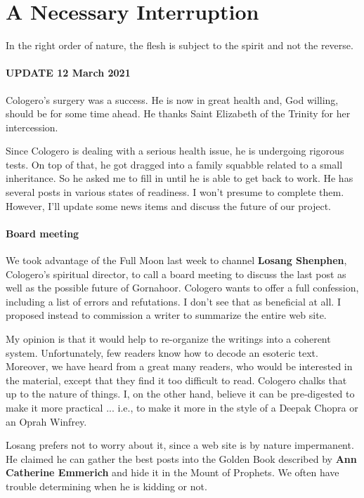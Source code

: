 \section{A Necessary Interruption}

\begin{quotex}
In the right order of nature, the flesh is subject to the spirit and not the reverse.
\end{quotex}


\paragraph{UPDATE 12 March 2021}
Cologero's surgery was a success. He is now in great health and, God willing, should be for some time ahead. He thanks Saint Elizabeth of the Trinity for her intercession.

Since Cologero is dealing with a serious health issue, he is undergoing rigorous tests. On top of that, he got dragged into a family squabble related to a small inheritance. So he asked me to fill in until he is able to get back to work. He has several posts in various states of readiness. I won't presume to complete them. However, I'll update some news items and discuss the future of our project.

\paragraph{Board meeting}


We took advantage of the Full Moon last week to channel \textbf{Losang Shenphen}, Cologero's spiritual director, to call a board meeting to discuss the last post as well as the possible future of Gornahoor. Cologero wants to offer a full confession, including a list of errors and refutations. I don't see that as beneficial at all. I proposed instead to commission a writer to summarize the entire web site.

My opinion is that it would help to re-organize the writings into a coherent system. Unfortunately, few readers know how to decode an esoteric text. Moreover, we have heard from a great many readers, who would be interested in the material, except that they find it too difficult to read. Cologero chalks that up to the nature of things. I, on the other hand, believe it can be pre-digested to make it more practical ... i.e., to make it more in the style of a Deepak Chopra or an Oprah Winfrey.

Losang prefers not to worry about it, since a web site is by nature impermanent. He claimed he can gather the best posts into the Golden Book described by \textbf{Ann Catherine Emmerich} and hide it in the Mount of Prophets. We often have trouble determining when he is kidding or not.

